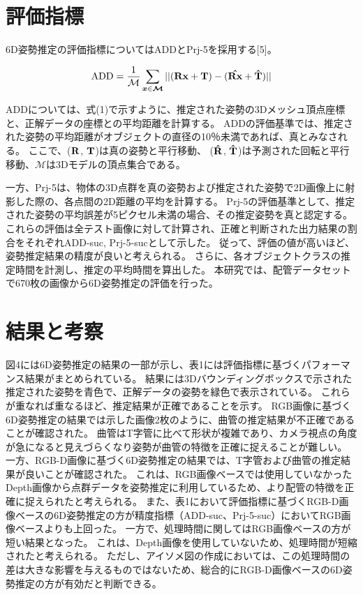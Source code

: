 \section{評価指標}
6D姿勢推定の評価指標についてはADDとPrj-5を採用する[5]。

\begin{equation}
\textrm{ADD} = \frac{1}{\mathcal{M}}\sum_{\boldsymbol{x}\in \boldsymbol{\mathcal{M}}}||(\boldsymbol{\textrm{\textbf{Rx}}} + \boldsymbol{\textrm{\textbf{\textbf{T}}}}) - (\boldsymbol{\hat{\textrm{\textbf{Rx}}}} +  \boldsymbol{\hat{\textrm{\textbf{T}}}})||
\end{equation}

ADDについては、式(1)で示すように、推定された姿勢の3Dメッシュ頂点座標と、正解データの座標との平均距離を計算する。
ADDの評価基準では、推定された姿勢の平均距離がオブジェクトの直径の10％未満であれば、真とみなされる。
ここで、($\boldsymbol{\textrm{\textbf{R}}}$, $\boldsymbol{\textrm{\textbf{T}}}$)は真の姿勢と平行移動、 ($\boldsymbol{\hat{\textrm{\textbf{R}}}}$, $\boldsymbol{\hat{\textrm{\textbf{T}}}}$)は予測された回転と平行移動、$\boldsymbol{\mathcal{M}}$は3Dモデルの頂点集合である。

一方、Prj-5は、物体の3D点群を真の姿勢および推定された姿勢で2D画像上に射影した際の、各点間の2D距離の平均を計算する。
Prj-5の評価基準として、推定された姿勢の平均誤差が5ピクセル未満の場合、その推定姿勢を真と認定する。
これらの評価は全テスト画像に対して計算され、正確と判断された出力結果の割合をそれぞれADD-suc, Prj-5-sucとして示した。
従って、評価の値が高いほど、姿勢推定結果の精度が良いと考えられる。
さらに、各オブジェクトクラスの推定時間を計測し、推定の平均時間を算出した。
本研究では、配管データセットで670枚の画像から6D姿勢推定の評価を行った。


\section{結果と考察}
図4には6D姿勢推定の結果の一部が示し、表1には評価指標に基づくパフォーマンス結果がまとめられている。
結果には3Dバウンディングボックスで示された推定された姿勢を青色で、正解データの姿勢を緑色で表示されている。
これらが重なれば重なるほど、推定結果が正確であることを示す。
RGB画像に基づく6D姿勢推定の結果では示した画像2枚のように、曲管の推定結果が不正確であることが確認された。
曲管はT字管に比べて形状が複雑であり、カメラ視点の角度が急になると見えづらくなり姿勢が曲管の特徴を正確に捉えることが難しい。
一方、RGB-D画像に基づく6D姿勢推定の結果では、T字管および曲管の推定結果が良いことが確認された。
これは、RGB画像ベースでは使用していなかったDepth画像から点群データを姿勢推定に利用しているため、より配管の特徴を正確に捉えられたと考えられる。
また、表1において評価指標に基づくRGB-D画像ベースの6D姿勢推定の方が精度指標（ADD-suc、Prj-5-suc）においてRGB画像ベースよりも上回った。
一方で、処理時間に関してはRGB画像ベースの方が短い結果となった。
これは、Depth画像を使用していないため、処理時間が短縮されたと考えられる。
ただし、アイソメ図の作成においては、この処理時間の差は大きな影響を与えるものではないため、総合的にRGB-D画像ベースの6D姿勢推定の方が有効だと判断できる。

